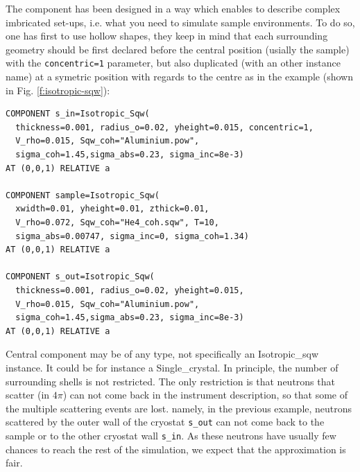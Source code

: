 The component has been designed in a way which enables to describe complex imbricated set-ups, i.e. what you need to simulate sample environments. To do so, one has first to use hollow shapes, they keep in mind that each surrounding geometry should be first declared before the central position (usially the sample) with the \verb+concentric=1+ parameter, but also duplicated (with an other instance name) at a symetric position with regards to the centre as in the example (shown in Fig. \ref{f:isotropic-sqw}):
\begin{verbatim}
COMPONENT s_in=Isotropic_Sqw(
  thickness=0.001, radius_o=0.02, yheight=0.015, concentric=1,
  V_rho=0.015, Sqw_coh="Aluminium.pow",
  sigma_coh=1.45,sigma_abs=0.23, sigma_inc=8e-3)
AT (0,0,1) RELATIVE a

COMPONENT sample=Isotropic_Sqw(
  xwidth=0.01, yheight=0.01, zthick=0.01,
  V_rho=0.072, Sqw_coh="He4_coh.sqw", T=10,
  sigma_abs=0.00747, sigma_inc=0, sigma_coh=1.34)
AT (0,0,1) RELATIVE a

COMPONENT s_out=Isotropic_Sqw(
  thickness=0.001, radius_o=0.02, yheight=0.015,
  V_rho=0.015, Sqw_coh="Aluminium.pow",
  sigma_coh=1.45,sigma_abs=0.23, sigma_inc=8e-3)
AT (0,0,1) RELATIVE a
\end{verbatim}
Central component may be of any type, not specifically an Isotropic\_sqw instance. It could be for instance a Single\_crystal.
In principle, the number of surrounding shells is not restricted.
The only restriction is that neutrons that scatter (in $4\pi$) can not come back in the instrument description, so that some of the multiple scattering events are lost. namely, in the previous example, neutrons scattered by the outer wall of the cryostat \verb+s_out+ can not come back to the sample or to the other cryostat wall \verb+s_in+. As these neutrons have usually few chances to reach the rest of the simulation, we expect that the approximation is fair.



